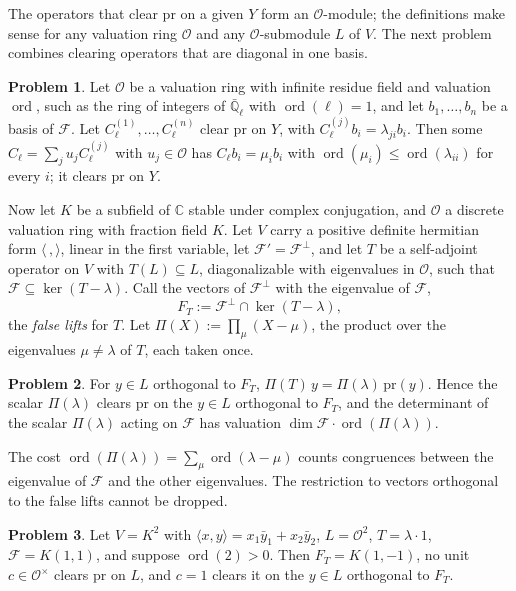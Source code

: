 \documentclass[reqno]{amsart}
\theoremstyle{definition}
\newtheorem{problem}{Problem}[section]
\newcommand{\Q}{\mathbb{Q}}
\newcommand{\C}{\mathbb{C}}
\newcommand{\Oc}{\mathcal{O}}
\newcommand{\pr}{\mathrm{pr}}
\newcommand{\ord}{\operatorname{ord}}
\begin{document}
The operators that clear \(\pr\) on a given \(Y\) form an \(\Oc\)-module; the definitions make sense for any valuation ring \(\Oc\) and any \(\Oc\)-submodule \(L\) of \(V\).  The next problem combines clearing operators that are diagonal in one basis.

\begin{problem}\label{pr:diagonal}
Let \(\Oc\) be a valuation ring with infinite residue field and valuation \(\ord\), such as the ring of integers of \(\bar{\Q}_\ell\) with \(\ord(\ell) = 1\), and let \(b_1, \dots, b_n\) be a basis of \(\mathcal F\).  Let \(C_\ell^{(1)}, \dots, C_\ell^{(n)}\) clear \(\pr\) on \(Y\), with \(C_\ell^{(j)} b_i = \lambda_{ji} b_i\).  Then some \(C_\ell = \sum_j u_j C_\ell^{(j)}\) with \(u_j \in \Oc\) has \(C_\ell b_i = \mu_i b_i\) with \(\ord(\mu_i) \le \ord(\lambda_{ii})\) for every \(i\); it clears \(\pr\) on \(Y\).
\end{problem}

Now let \(K\) be a subfield of \(\C\) stable under complex conjugation, and \(\Oc\) a discrete valuation ring with fraction field \(K\).  Let \(V\) carry a positive definite hermitian form \(\langle\,,\rangle\), linear in the first variable, let \(\mathcal F' = \mathcal F^\perp\), and let \(T\) be a self-adjoint operator on \(V\) with \(T(L) \subseteq L\), diagonalizable with eigenvalues in \(\Oc\), such that \(\mathcal F \subseteq \ker(T - \lambda)\).  Call the vectors of \(\mathcal F^\perp\) with the eigenvalue of \(\mathcal F\),
\[
  F_T := \mathcal F^\perp \cap \ker(T - \lambda) ,
\]
the \emph{false lifts} for \(T\).  Let \(\Pi(X) := \prod_\mu (X - \mu)\), the product over the eigenvalues \(\mu \ne \lambda\) of \(T\), each taken once.

\begin{problem}\label{pr:hecke-clear}
For \(y \in L\) orthogonal to \(F_T\), \(\Pi(T)\,y = \Pi(\lambda)\,\pr(y)\).  Hence the scalar \(\Pi(\lambda)\) clears \(\pr\) on the \(y \in L\) orthogonal to \(F_T\), and the determinant of the scalar \(\Pi(\lambda)\) acting on \(\mathcal F\) has valuation \(\dim \mathcal F \cdot \ord(\Pi(\lambda))\).
\end{problem}

The cost \(\ord(\Pi(\lambda)) = \sum_\mu \ord(\lambda - \mu)\) counts congruences between the eigenvalue of \(\mathcal F\) and the other eigenvalues.  The restriction to vectors orthogonal to the false lifts cannot be dropped.

\begin{problem}\label{pr:false-needed}
Let \(V = K^2\) with \(\langle x, y \rangle = x_1\bar y_1 + x_2\bar y_2\), \(L = \Oc^2\), \(T = \lambda\cdot 1\), \(\mathcal F = K(1,1)\), and suppose \(\ord(2) > 0\).  Then \(F_T = K(1,-1)\), no unit \(c \in \Oc^\times\) clears \(\pr\) on \(L\), and \(c = 1\) clears it on the \(y \in L\) orthogonal to \(F_T\).
\end{problem}
\end{document}
